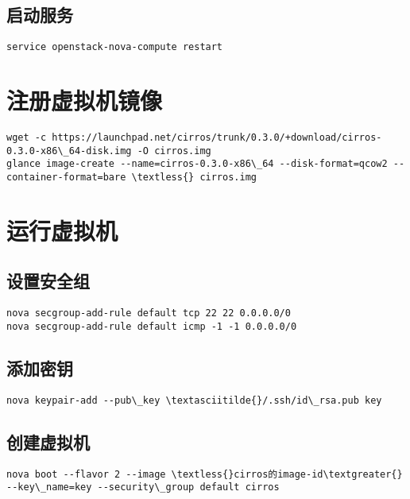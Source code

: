\documentclass[a4paper,12pt,english]{sphinxmanual}
\begin{document}
\section{启动服务}
\label{nova_compute:id4}
\begin{Verbatim}[commandchars=\\\{\}]
service openstack-nova-compute restart
\end{Verbatim}


\chapter{注册虚拟机镜像}
\label{image_create::doc}\label{image_create:id1}
\begin{Verbatim}[commandchars=\\\{\}]
wget -c https://launchpad.net/cirros/trunk/0.3.0/+download/cirros-0.3.0-x86\_64-disk.img -O cirros.img
glance image-create --name=cirros-0.3.0-x86\_64 --disk-format=qcow2 --container-format=bare \textless{} cirros.img
\end{Verbatim}


\chapter{运行虚拟机}
\label{run::doc}\label{run:id1}

\section{设置安全组}
\label{run:id2}
\begin{Verbatim}[commandchars=\\\{\}]
nova secgroup-add-rule default tcp 22 22 0.0.0.0/0
nova secgroup-add-rule default icmp -1 -1 0.0.0.0/0
\end{Verbatim}


\section{添加密钥}
\label{run:id3}
\begin{Verbatim}[commandchars=\\\{\}]
nova keypair-add --pub\_key \textasciitilde{}/.ssh/id\_rsa.pub key
\end{Verbatim}


\section{创建虚拟机}
\label{run:id4}
\begin{Verbatim}[commandchars=\\\{\}]
nova boot --flavor 2 --image \textless{}cirros的image-id\textgreater{} --key\_name=key --security\_group default cirros
\end{Verbatim}
\end{document}
